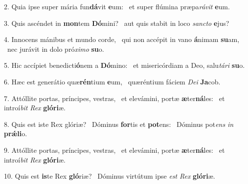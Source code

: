 2. Quia ipse super mária fun\textbf{dá}vit \textbf{e}um: \ast\  et super flúmina præpa\textit{rá}\textit{vit} \textbf{e}um.\

3. Quis ascéndet in \textbf{mon}tem \textbf{Dó}mini? \ast\  aut quis stabit in loco \textit{sanc}\textit{to} \textbf{e}jus?\

4. Innocens mánibus et mundo corde, \dag\  qui non accépit in vano \textbf{á}nimam \textbf{su}am, \ast\  nec jurávit in dolo pró\textit{xi}\textit{mo} \textbf{su}o.\

5. Hic accípiet benedicti\textbf{ó}nem a \textbf{Dó}mino: \ast\  et misericórdiam a Deo, salu\textit{tá}\textit{ri} \textbf{su}o.\

6. Hæc est generátio quæ\textbf{rén}tium \textbf{e}um, \ast\  quæréntium fáciem \textit{De}\textit{i} \textbf{Ja}cob.\

7. Attóllite portas, príncipes, vestras, \dag\  et elevámini, portæ \textbf{æ}ter\textbf{ná}les: \ast\  et introí\textit{bit} \textit{Rex} \textbf{gló}\textbf{ri}æ.\

8. Quis est iste Rex glóriæ? \dag\  Dóminus \textbf{for}tis et \textbf{pot}ens: \ast\  Dóminus pot\textit{ens} \textit{in} \textbf{prǽ}\textbf{li}o.\

9. Attóllite portas, príncipes, vestras, \dag\  et elevámini, portæ \textbf{æ}ter\textbf{ná}les: \ast\  et introí\textit{bit} \textit{Rex} \textbf{gló}\textbf{ri}æ.\

10. Quis est \textbf{is}te Rex \textbf{gló}riæ? \ast\  Dóminus virtútum ipse \textit{est} \textit{Rex} \textbf{gló}\textbf{ri}æ.\

